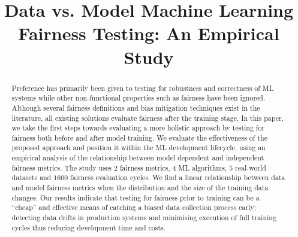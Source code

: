 \documentclass[conference,review,anonymous]{IEEEtran}
\begin{document}
\title{Data vs. Model Machine Learning Fairness Testing: An Empirical Study}


\author{
\and
{}
\and
{}
}


\maketitle

\begin{abstract}

  Preference has primarily been given to testing for robustness and
  correctness of ML systems while other non-functional properties such
  as fairness have been ignored. Although several fairness definitions
  and bias mitigation techniques exist in the literature, all existing
  solutions evaluate fairness after the training stage. In this paper,
  we take the first steps towards evaluating a more holistic approach
  by testing for fairness both before and after model training. We
  evaluate the effectiveness of the proposed approach and position it
  within the ML development lifecycle, using an empirical analysis of
  the relationship between model dependent and independent fairness
  metrics. The study uses $2$ fairness metrics, $4$ ML algorithms, $5$
  real-world datasets and $1600$ fairness evaluation cycles. We find a
  linear relationship between data and model fairness metrics when the
  distribution and the size of the training data changes. Our results
  indicate that testing for fairness prior to training can be a
  ``cheap'' and effective means of catching a biased data collection
  process early; detecting data drifts in production systems and
  minimising execution of full training cycles thus reducing
  development time and costs.

\end{abstract}
\end{document}
